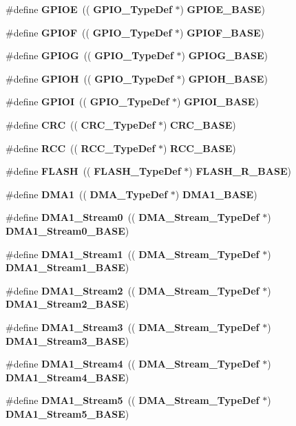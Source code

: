 \begin{DoxyCompactItemize}
\item 
\#define \textbf{ G\+P\+I\+OE}~((\textbf{ G\+P\+I\+O\+\_\+\+Type\+Def} $\ast$) \textbf{ G\+P\+I\+O\+E\+\_\+\+B\+A\+SE})
\item 
\#define \textbf{ G\+P\+I\+OF}~((\textbf{ G\+P\+I\+O\+\_\+\+Type\+Def} $\ast$) \textbf{ G\+P\+I\+O\+F\+\_\+\+B\+A\+SE})
\item 
\#define \textbf{ G\+P\+I\+OG}~((\textbf{ G\+P\+I\+O\+\_\+\+Type\+Def} $\ast$) \textbf{ G\+P\+I\+O\+G\+\_\+\+B\+A\+SE})
\item 
\#define \textbf{ G\+P\+I\+OH}~((\textbf{ G\+P\+I\+O\+\_\+\+Type\+Def} $\ast$) \textbf{ G\+P\+I\+O\+H\+\_\+\+B\+A\+SE})
\item 
\#define \textbf{ G\+P\+I\+OI}~((\textbf{ G\+P\+I\+O\+\_\+\+Type\+Def} $\ast$) \textbf{ G\+P\+I\+O\+I\+\_\+\+B\+A\+SE})
\item 
\#define \textbf{ C\+RC}~((\textbf{ C\+R\+C\+\_\+\+Type\+Def} $\ast$) \textbf{ C\+R\+C\+\_\+\+B\+A\+SE})
\item 
\#define \textbf{ R\+CC}~((\textbf{ R\+C\+C\+\_\+\+Type\+Def} $\ast$) \textbf{ R\+C\+C\+\_\+\+B\+A\+SE})
\item 
\#define \textbf{ F\+L\+A\+SH}~((\textbf{ F\+L\+A\+S\+H\+\_\+\+Type\+Def} $\ast$) \textbf{ F\+L\+A\+S\+H\+\_\+\+R\+\_\+\+B\+A\+SE})
\item 
\#define \textbf{ D\+M\+A1}~((\textbf{ D\+M\+A\+\_\+\+Type\+Def} $\ast$) \textbf{ D\+M\+A1\+\_\+\+B\+A\+SE})
\item 
\#define \textbf{ D\+M\+A1\+\_\+\+Stream0}~((\textbf{ D\+M\+A\+\_\+\+Stream\+\_\+\+Type\+Def} $\ast$) \textbf{ D\+M\+A1\+\_\+\+Stream0\+\_\+\+B\+A\+SE})
\item 
\#define \textbf{ D\+M\+A1\+\_\+\+Stream1}~((\textbf{ D\+M\+A\+\_\+\+Stream\+\_\+\+Type\+Def} $\ast$) \textbf{ D\+M\+A1\+\_\+\+Stream1\+\_\+\+B\+A\+SE})
\item 
\#define \textbf{ D\+M\+A1\+\_\+\+Stream2}~((\textbf{ D\+M\+A\+\_\+\+Stream\+\_\+\+Type\+Def} $\ast$) \textbf{ D\+M\+A1\+\_\+\+Stream2\+\_\+\+B\+A\+SE})
\item 
\#define \textbf{ D\+M\+A1\+\_\+\+Stream3}~((\textbf{ D\+M\+A\+\_\+\+Stream\+\_\+\+Type\+Def} $\ast$) \textbf{ D\+M\+A1\+\_\+\+Stream3\+\_\+\+B\+A\+SE})
\item 
\#define \textbf{ D\+M\+A1\+\_\+\+Stream4}~((\textbf{ D\+M\+A\+\_\+\+Stream\+\_\+\+Type\+Def} $\ast$) \textbf{ D\+M\+A1\+\_\+\+Stream4\+\_\+\+B\+A\+SE})
\item 
\#define \textbf{ D\+M\+A1\+\_\+\+Stream5}~((\textbf{ D\+M\+A\+\_\+\+Stream\+\_\+\+Type\+Def} $\ast$) \textbf{ D\+M\+A1\+\_\+\+Stream5\+\_\+\+B\+A\+SE})

\end{DoxyCompactItemize}

